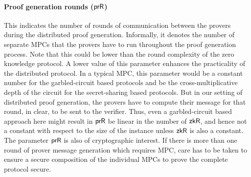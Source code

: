 \paragraph{Proof generation rounds ($\mathsf{prR}$)}
This indicates the number of rounds of communication between the provers during
the distributed proof generation. Informally, it denotes the number of separate
MPCs that the provers have to run throughout the proof generation process. Note
that this could be lower than the round complexity of the zero knowledge
protocol. A lower value of this parameter enhances the practicality of the
distributed protocol.
{\color{blue} In a typical MPC, this parameter would be a constant number for
the garbled-circuit based protocols and be the cross-multiplicative depth of the
circuit for the secret-sharing based protocols. But in our setting of
distributed proof generation, the provers have to compute their message for that
round, in clear, to be sent to the verifier. Thus, even a garbled-circuit based
approach here might result in $\mathsf{prR}$ be linear in the number of
$\mathsf{zkR}$, and hence not a constant with respect to the size of the instance
unless $\mathsf{zkR}$ is also a constant.} 
The parameter $\mathsf{prR}$ is also of cryptographic interest. If there is more than one round of prover message generation which requires MPC, care has to be taken to ensure a secure composition of the individual MPCs to prove the complete protocol secure.

